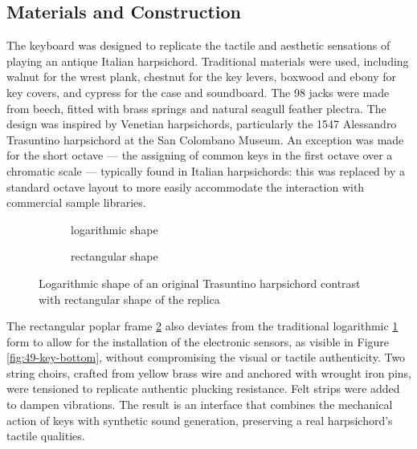 \subsection{Materials and Construction}

The keyboard was designed to replicate the tactile and aesthetic sensations of playing an antique Italian harpsichord. Traditional materials were used, including walnut for the wrest plank, chestnut for the key levers, boxwood and ebony for key covers, and cypress for the case and soundboard. The 98 jacks were made from beech, fitted with brass springs and natural seagull feather plectra. The design was inspired by Venetian harpsichords, particularly the 1547 Alessandro Trasuntino harpsichord at the San Colombano Museum. An exception was made for the short octave --- the assigning of common keys in the first octave over a chromatic scale --- typically found in Italian harpsichords: this was replaced by a standard octave layout to more easily accommodate the interaction with commercial sample libraries. 

\begin{figure}
    \centering
     \begin{subfigure}[h]{0.4\linewidth}
        \centering
                    
        \caption{logarithmic shape}    
        \label{fig:log-harp}
    \end{subfigure}

    
    \begin{subfigure}[h]{0.4\linewidth}
        \centering
                
        \caption{rectangular shape}
        \label{fig:rect-harp}
    \end{subfigure}
    \caption{Logarithmic shape of an original Trasuntino harpsichord contrast with rectangular shape of the replica}    
    \Description{}
    \label{fig:log-harp-comp}
\end{figure}

The rectangular poplar frame \ref{fig:rect-harp} also deviates from the traditional logarithmic \ref{fig:log-harp} form to allow for the installation of the electronic sensors, as visible in Figure \ref{fig:49-key-bottom}, without compromising the visual or tactile authenticity. Two string choirs, crafted from yellow brass wire and anchored with wrought iron pins, were tensioned to replicate authentic plucking resistance. Felt strips were added to dampen vibrations. The result is an interface that combines the mechanical action of keys with synthetic sound generation, preserving a real harpsichord's tactile qualities.

